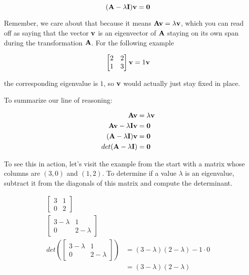 \begin{equation*}
  (\mathbf{A} - \lambda\mathbf{I})\mathbf{v} = \mathbf{0}
\end{equation*}

Remember, we care about that because it means
$\mathbf{A}\mathbf{v} = \lambda\mathbf{v}$, which you can read off as saying that the
vector $\mathbf{v}$ is an eigenvector of $\mathbf{A}$ staying on its own span during
the transformation $\mathbf{A}$. For the following example

\begin{equation*}
  \begin{bmatrix}
    2 & 2 \\
    1 & 3
  \end{bmatrix}
  \mathbf{v} = 1\mathbf{v}
\end{equation*}

the corresponding eigenvalue is $1$, so $\mathbf{v}$ would actually just stay fixed
in place.

To summarize our line of reasoning:

\begin{align*}
  \mathbf{A}\mathbf{v} &= \lambda\mathbf{v} \\
  \mathbf{A}\mathbf{v} - \lambda\mathbf{I}\mathbf{v} &= \mathbf{0} \\
  (\mathbf{A} - \lambda\mathbf{I})\mathbf{v} &= \mathbf{0} \\
  det(\mathbf{A} - \lambda\mathbf{I}) &= \mathbf{0}
\end{align*}

To see this in action, let's visit the example from the start with a matrix
whose columns are $(3, 0)$ and $(1, 2)$. To determine if a value $\lambda$ is an
eigenvalue, subtract it from the diagonals of this matrix and compute the
determinant.

\begin{align*}
  \begin{bmatrix}
    3 & 1 \\
    0 & 2
  \end{bmatrix} & \\
  \begin{bmatrix}
    3 - \lambda & 1 \\
    0 & 2 - \lambda
  \end{bmatrix} & \\
  det\left(\begin{bmatrix}
    3 - \lambda & 1 \\
    0 & 2 - \lambda
  \end{bmatrix}\right) &=
  (3 - \lambda)(2 - \lambda) - 1 \cdot 0 \\
  &= (3 - \lambda)(2 - \lambda)
\end{align*}


